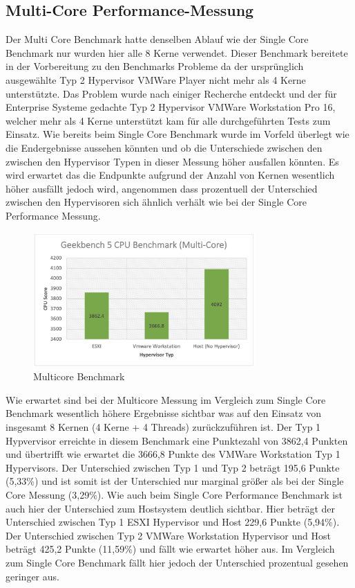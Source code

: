 \documentclass[conference]{IEEEtran}
\begin{document}
\subsection{Multi-Core Performance-Messung}
Der Multi Core Benchmark hatte denselben Ablauf wie der Single Core Benchmark nur wurden hier alle 8 Kerne verwendet. Dieser Benchmark bereitete in der Vorbereitung zu den Benchmarks Probleme da der ursprünglich ausgewählte Typ 2 Hypervisor VMWare Player nicht mehr als 4 Kerne unterstützte. Das Problem wurde nach einiger Recherche entdeckt und der für Enterprise Systeme gedachte Typ 2 Hypervisor VMWare Workstation Pro 16, welcher mehr als 4 Kerne unterstützt kam für alle durchgeführten Tests zum Einsatz.
Wie bereits beim Single Core Benchmark wurde im Vorfeld überlegt wie die Endergebnisse aussehen könnten und ob die Unterschiede zwischen den zwischen den Hypervisor Typen in dieser Messung höher ausfallen könnten. Es wird erwartet das die Endpunkte aufgrund der Anzahl von Kernen wesentlich höher ausfällt jedoch wird, angenommen dass prozentuell der Unterschied zwischen den Hypervisoren sich ähnlich verhält wie bei der Single Core Performance Messung. \newline

\begin{figure}[!h]
	\centering
	\includegraphics[keepaspectratio,width=8.5cm,height=0.75\textheight]{multicore.png}
	\caption{Multicore Benchmark}
	\label{architecture}
\end{figure}

Wie erwartet sind bei der Multicore Messung im Vergleich zum Single Core Benchmark wesentlich höhere Ergebnisse sichtbar was auf den Einsatz von insgesamt 8 Kernen (4 Kerne + 4 Threads) zurückzuführen ist. Der Typ 1 Hypvervisor erreichte in diesem Benchmark eine Punktezahl von 3862,4 Punkten und übertrifft wie erwartet die 3666,8 Punkte des VMWare Workstation Typ 1 Hypervisors. Der Unterschied zwischen Typ 1 und Typ 2 beträgt 195,6 Punkte (5,33\%) und ist somit ist der Unterschied nur marginal größer als bei der Single Core Messung (3,29\%). Wie auch beim Single Core Performance Benchmark ist auch hier der Unterschied zum Hostsystem deutlich sichtbar. Hier beträgt der Unterschied zwischen Typ 1 ESXI Hypervisor und Host 229,6 Punkte (5,94\%). Der Unterschied zwischen Typ 2 VMWare Workstation Hypervisor und Host beträgt 425,2 Punkte (11,59\%) und fällt wie erwartet höher aus. Im Vergleich zum Single Core Benchmark fällt hier jedoch der Unterschied prozentual gesehen geringer aus.
\end{document}
